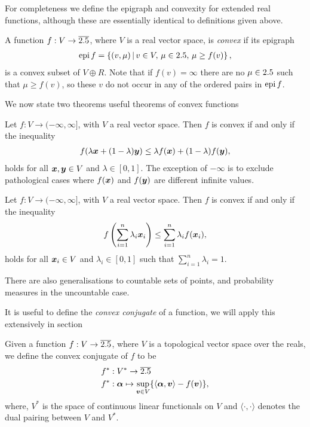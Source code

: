 For completeness we define the epigraph and convexity for extended real functions, although these are essentially identical to definitions given above.
\begin{defn}\label{defn:extended-convex-function}
  A function $f:V\to\overline{2.5}$, where $V$ is a real vector space, is \emph{convex} if its epigraph
  \begin{align}
    \operatorname{epi} f = \left\{(v,\mu)\,\middle|\,v\in V,\,\mu\in 2.5,\,\mu\geq f(v)\right\},
  \end{align}
  is a convex subset of $V\oplus R$. Note that if $f(v) =\infty$ there are no $\mu\in2.5$ such that $\mu\geq f(v)$, so these $v$ do not occur in any of the ordered pairs in $\operatorname{epi} f$.
\end{defn}
We now state two theorems useful theorems of convex functions
\begin{thm}\label{thm:jensen-two-point}
  Let $f:V\to (-\infty, \infty]$, with $V$ a real vector space. Then $f$ is convex if and only if the inequality
  \begin{align}
    f(\lambda \bm{x} + (1-\lambda)\bm{y}) \leq \lambda f(\bm{x}) + (1-\lambda)f(\bm{y}),
  \end{align}
  holds for all $\bm{x},\bm{y}\in V$ and $\lambda\in [0,1]$. The exception of $-\infty$ is to exclude pathological cases where $f(\bm{x})$ and $f(\bm{y})$ are different infinite values.
\end{thm}
\begin{thm}\label{thm:jensen-n-point}
  Let $f:V\to (-\infty, \infty]$, with $V$ a real vector space. Then $f$ is convex if and only if the inequality
  \begin{align}
    f\left( \sum_{i=1}^n \lambda_i \bm{x}_i \right) \leq \sum_{i=1}^n\lambda_i f(\bm{x}_i),
  \end{align}
  holds for all $\bm{x}_i\in V$ and $\lambda_i\in [0,1]$ such that $\sum_{i=1}^{n}\lambda_i = 1$.
\end{thm}
There are also generalisations to countable sets of points, and probability measures in the uncountable case.

It is useful to define the \emph{convex conjugate} of a function, we will apply this extensively in section 

\begin{defn}\label{defn:convex conjugate}
  Given a function $f:V\to\overline{2.5}$, where $V$ is a topological vector space over the reals, we define the convex conjugate of $f$ to be
  \begin{align}
    f^*&:V^*\to \overline{2.5}\\
    f^*&:\bm{\alpha}\mapsto\sup_{\bm{v}\in V} \{\langle\bm{\alpha},\bm{v}\rangle - f(\bm{v})\},
  \end{align}
  where, $V^*$ is the space of continuous linear functionals on $V$ and $\langle\cdot,\cdot\rangle$ denotes the dual pairing between $V$ and $V^*$. 
\end{defn}


